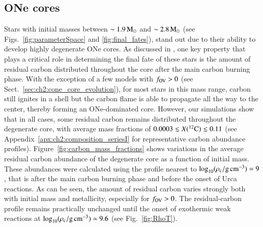 \documentclass[main.tex]{subfiles}
\begin{document}
\subsection{ONe cores}\label{sec:ch2:one_core_evolution}
Stars with initial masses between $\sim 1.9\msun$ and $\sim  2.8\msun$ (see Figs.~\ref{fig:parameterSpace} and \ref{fig:final_fates}),  stand out due to their ability to develop highly degenerate ONe cores. As discussed in , one key property that  plays a critical role in determining the final fate of these stars is the amount of residual carbon distributed throughout the core  after the main carbon burning phase. 
With the exception of a few models with $f_{\rm OV}> 0$ (see Sect.~\ref{sec:ch2:cone_core_evolution}), for  most stars in this mass range, carbon still ignites  in a shell but the carbon flame
is able to propagate all the way to the center, thereby forming an ONe-dominated core. 
However, our simulations show that in all cases, some residual carbon remains
distributed throughout the degenerate core, with average mass fractions of $0.0003 \lesssim X(\iso{C}{12}) \lesssim 0.11$ (see Appendix~\ref{apx:ch2:composition_seriesI} for representative carbon abundance profiles). 
Figure~\ref{fig:carbon_mass_fractions} shows variations in  the average residual carbon abundance of the degenerate core as a function of initial mass.
These abundances were calculated using the \mesa profile nearest to $\logrhoc=9$, that is after the main carbon burning phase and before the onset of Urca reactions. As can be seen, the amount of residual carbon varies strongly both with initial mass and metallicity, especially for $f_{\rm OV}>0$.  
 The residual-carbon profile remains practically unchanged until the  onset of exothermic weak reactions at $\logrhoc\simeq 9.6$ (see Fig.~\ref{fig:RhoT}).
\end{document}

